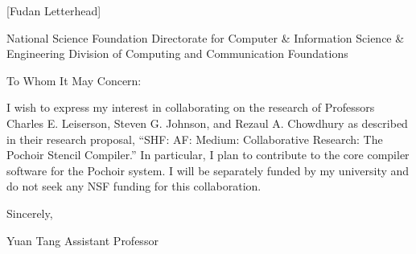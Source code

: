 [Fudan Letterhead]

National Science Foundation
Directorate for Computer & Information Science & Engineering 
Division of Computing and Communication Foundations

To Whom It May Concern:

I wish to express my interest in collaborating on the research of
Professors Charles E. Leiserson, Steven G. Johnson, and Rezaul
A. Chowdhury as described in their research proposal, ``SHF: AF:
Medium: Collaborative Research: The Pochoir Stencil Compiler.''  In
particular, I plan to contribute to the core compiler software for the
Pochoir system.  I will be separately funded by my university and do
not seek any NSF funding for this collaboration.

Sincerely,

Yuan Tang
Assistant Professor
